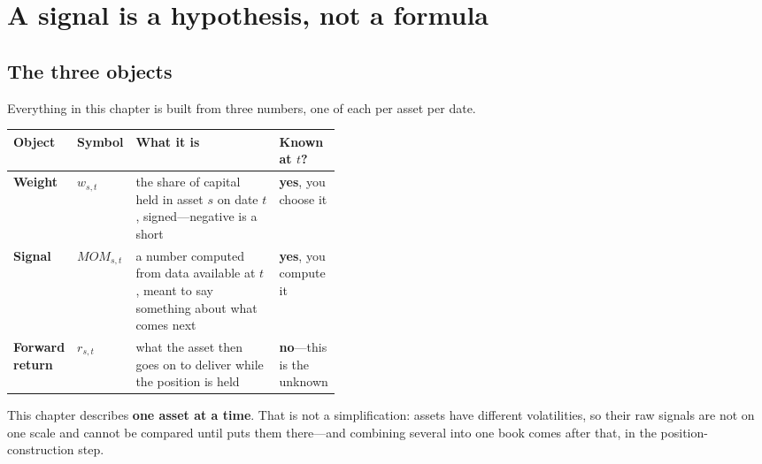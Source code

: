 


\section{A signal is a hypothesis, not a formula}\label{sec:signal-hypothesis}

\subsection{The three objects}\label{sec:three-objects}

Everything in this chapter is built from three numbers, one of each per asset per date.

\begin{tabularx}{\linewidth}{|>{\raggedright\arraybackslash}p{0.16\linewidth}|>{\raggedright\arraybackslash}p{0.10\linewidth}|X|>{\raggedright\arraybackslash}p{0.17\linewidth}|}
\hline
\textbf{Object} & \textbf{Symbol} & \textbf{What it is} & \textbf{Known at $t$?} \\ \hline
\textbf{Weight}
  & $w_{s,t}$
  & the share of capital held in asset $s$ on date $t$, signed---negative is a short
  & \textbf{yes}, you choose it \\ \hline
\textbf{Signal}
  & $\mathit{MOM}_{s,t}$
  & a number computed from data available at $t$, meant to say something about what comes next
  & \textbf{yes}, you compute it \\ \hline
\textbf{Forward return}
  & $r_{s,t}$
  & what the asset then goes on to deliver while the position is held
  & \textbf{no}---this is the unknown \\ \hline
\end{tabularx}

\begin{note}[Scope]
This chapter describes \textbf{one asset at a time}. That is not a simplification: assets have
different volatilities, so their raw signals are not on one scale and cannot be compared until
 puts them there---and combining several into one book comes after that,
in the position-construction step.
\end{note}

